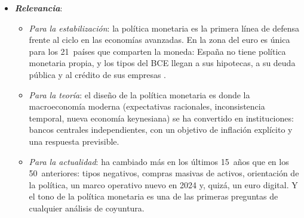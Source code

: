 \documentclass[11pt]{article}
\begin{document}
\begin{itemize}
\item \textbf{\emph{Relevancia}}:
  \begin{itemize}
  \item \emph{Para la estabilización}: la política monetaria es la primera línea de defensa frente al ciclo en las economías avanzadas. En la zona del euro es única para los 21~países que comparten la moneda: España no tiene política monetaria propia, y los tipos del BCE llegan a sus hipotecas, a su deuda pública y al crédito de sus empresas .
  \item \emph{Para la teoría}: el diseño de la política monetaria es donde la macroeconomía moderna (expectativas racionales, inconsistencia temporal, nueva economía keynesiana) se ha convertido en instituciones: bancos centrales independientes, con un objetivo de inflación explícito y una respuesta previsible.
  \item \emph{Para la actualidad}: ha cambiado más en los últimos 15~años que en los 50~anteriores: tipos negativos, compras masivas de activos, orientación de la política, un marco operativo nuevo en 2024 y, quizá, un euro digital. Y el tono de la política monetaria es una de las primeras preguntas de cualquier análisis de coyuntura.
  \end{itemize}


\end{itemize}
\end{document}
